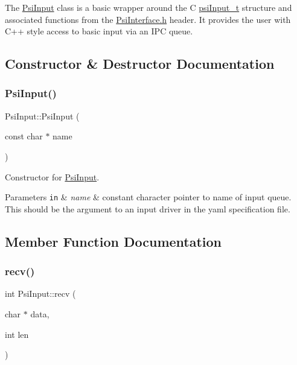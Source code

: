The \hyperlink{classPsiInput}{Psi\+Input} class is a basic wrapper around the C \hyperlink{structpsiInput__t}{psi\+Input\+\_\+t} structure and associated functions from the \hyperlink{PsiInterface_8h_source}{Psi\+Interface.\+h} header. It provides the user with C++ style access to basic input via an I\+PC queue. 

\subsection{Constructor \& Destructor Documentation}
\mbox{\label{classPsiInput_ac796a2dbddfc6b6aa54841d8c762cc6c}} 
\subsubsection{\texorpdfstring{Psi\+Input()}{PsiInput()}}
{\footnotesize\ttfamily Psi\+Input\+::\+Psi\+Input (\begin{DoxyParamCaption}\item[{const char $\ast$}]{name }\end{DoxyParamCaption})\hspace{0.3cm}{\ttfamily [inline]}}



Constructor for \hyperlink{classPsiInput}{Psi\+Input}. 


\begin{DoxyParams}[1]{Parameters}
\mbox{\tt in}  & {\em name} & constant character pointer to name of input queue. This should be the argument to an input driver in the yaml specification file. \\
\hline
\end{DoxyParams}


\subsection{Member Function Documentation}
\mbox{\label{classPsiInput_a480b3f1424806a23c3a1c77d590eb216}} 
\subsubsection{\texorpdfstring{recv()}{recv()}}
{\footnotesize\ttfamily int Psi\+Input\+::recv (\begin{DoxyParamCaption}\item[{char $\ast$}]{data,  }\item[{int}]{len }\end{DoxyParamCaption})\hspace{0.3cm}{\ttfamily [inline]}}



